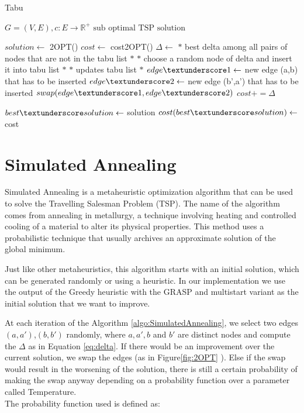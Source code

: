 \begin{algorithm}[!h]
    \caption{Tabu}\label{algo:tabu}
    \begin{algorithmic}[1]
    \Require $G = (V,E), c:E \to \mathbb{R}^+$
    \Ensure $\text{sub optimal TSP solution}$


    \State $solution \gets$ 2OPT()
    \State $cost \gets$ cost\textunderscore 2OPT()
    \State $\Delta\gets$ $*$ best delta among all pairs of nodes that are not in the tabu list $*$
    \State $*$ choose a random node of delta and insert it into tabu list $*$
    \State $*$ updates tabu list $*$
    \State $edge\textunderscore 1 \gets$ new edge (a,b) that has to be inserted
    \State $edge\textunderscore 2 \gets$ new edge (b',a') that has to be inserted
    \State $swap(edge\textunderscore 1,edge\textunderscore 2) $
    \State $cost += \Delta$

    \State $ best\textunderscore solution \gets$ solution
    \State $ cost(best\textunderscore solution) \gets$ cost
    \EndIf
    

    \EndWhile

    \end{algorithmic}
\end{algorithm}






\section{Simulated Annealing}

Simulated Annealing is a metaheuristic optimization algorithm that can be used to solve the Travelling Salesman Problem (TSP).
The name of the algorithm comes from annealing in metallurgy, a technique involving heating and controlled cooling of a material to alter its physical properties. This method uses a probabilistic technique that usually archives an approximate solution of the global minimum.

Just like other metaheuristics, this algorithm starts with an initial solution, which can be generated randomly or using a heuristic. In our implementation we use the output of the Greedy heuristic with the GRASP and multistart variant as the initial solution that we want to improve.

At each iteration of the Algorithm \ref{algo:SimulatedAnnealing}, we select two edges $(a,a')$,$(b,b')$ randomly, where $a,a',b$ and $b'$ are distinct nodes and compute the $\Delta$ as in Equation \ref{eq:delta}. If there would be an improvement over the current solution, we swap the edges (as in Figure\ref{fig:2OPT} ). Else if the swap would result in the worsening of the solution, there is still a certain probability of making the swap anyway depending on a probability function over a parameter called Temperature. \\The probability function used is defined as:



